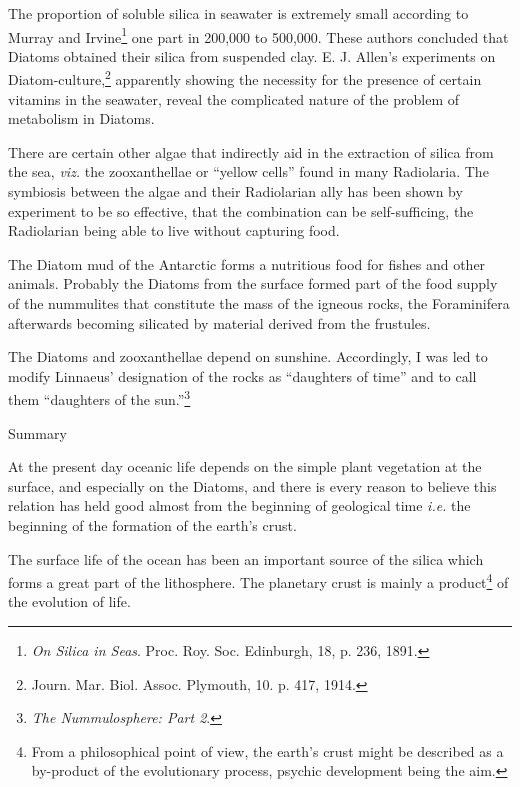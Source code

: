 \documentclass[a4paper, 12pt, oneside]{article}
\begin{document}
The proportion of soluble silica in seawater is extremely small according to Murray and Irvine\footnote{\emph{On Silica in Seas}. Proc. Roy. Soc. Edinburgh, 18, p. 236, 1891.} one part in 200,000 to 500,000. These authors concluded that Diatoms obtained their silica from suspended clay. E. J. Allen's experiments on Diatom-culture,\footnote{Journ. Mar. Biol. Assoc. Plymouth, 10. p. 417, 1914.} apparently showing the necessity for the presence of certain vitamins in the seawater, reveal the complicated nature of the problem of metabolism in Diatoms.

There are certain other algae that indirectly aid in the extraction of silica from the sea, \emph{viz.} the zooxanthellae or ``yellow cells'' found in many Radiolaria. The symbiosis between the algae and their Radiolarian ally has been shown by experiment to be so effective, that the combination can be self-sufficing, the Radiolarian being able to live without capturing food.

The Diatom mud of the Antarctic forms a nutritious food for fishes and other animals. Probably the Diatoms from the surface formed part of the food supply of the nummulites that constitute the mass of the igneous rocks, the Foraminifera afterwards becoming silicated by material derived from the frustules.

The Diatoms and zooxanthellae depend on sunshine. Accordingly, I was led to modify Linnaeus' designation of the rocks as ``daughters of time'' and to call them ``daughters of the sun.''\footnote{\emph{The Nummulosphere: Part 2}.}

\bigskip
\centerline{Summary} 

At the present day oceanic life depends on the simple plant vegetation at the surface, and especially on the Diatoms, and there is every reason to believe this relation has held good almost from the beginning of geological time \emph{i.e.} the beginning of the formation of the earth's crust.

The surface life of the ocean has been an important source of the silica which forms a great part of the lithosphere. The planetary crust is mainly a product\footnote{From a philosophical point of view, the earth's crust might be described as a by-product of the evolutionary process, psychic development being the aim.} of the evolution of life.
\end{document}
